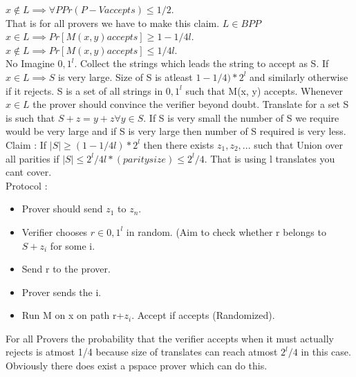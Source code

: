 \documentclass[solution,addpoints,12pt]{exam}
\begin{document}
$x \not \in L \implies \forall P Pr(P-V accepts) \le 1/2$.\\
That is for all provers we have to make this claim.
$L \in BPP$\\
$x \in L \implies Pr[M(x, y) accepts] \ge 1 - 1/4l$.\\
$x \not \in L \implies Pr[M(x, y) accepts] \le 1/4l$.\\
No
Imagine ${0, 1}^l$. Collect the strings which
leads the string to accept as S. If $x \in L \implies S$
is very large. Size of S is atleast $1 - 1/4)*2^l$ and similarly
otherwise if it rejects. S is a set of all strings in ${0, 1}^l$
such that M(x, y) accepts. Whenever $x \in L$ the prover should convince
the verifier beyond doubt. Translate for a set S is
such that $S + z = y + z \forall y \in S$. If S is very small
the number of S we require would be very large and if S is very
large then number of S required is very less.\\
Claim : If $|S| \ge (1-1/4l)*2^l$ then there exists
$z_1, z_2,...$ such that Union over all parities
if $|S| \le 2^l/4l*(parity size) \le 2^l/4$. That is
using l translates you cant cover.\\
Protocol :\\
\begin{itemize}
\item Prover should send $z_1$ to $z_n$.
\item Verifier chooses $r \in {0, 1}^l$ in random.
(Aim to check whether r belongs to $S+z_i$ for some i.\\
\item Send r to the prover.
\item Prover sends the i.
\item Run M on x on path r+$z_i$. Accept if accepts (Randomized).
\end{itemize}
For all Provers the probability that the verifier accepts
when it must actually rejects is atmost 1/4 because size
of translates can reach atmost $2^l/4$ in this case.\\
Obviously there does exist a pspace prover which can do this.
\end{document}
